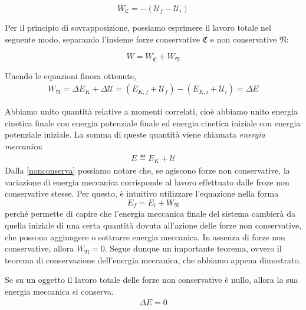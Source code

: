 \[ W_\mathfrak{C} = -(\mathcal{U}_f - \mathcal{U}_i) \]

\noindent Per il principio di sovrapposizione, possiamo esprimere il lavoro totale
nel seguente modo, separando l'insieme forze conservative $\mathfrak{C}$ e non conservative $\mathfrak{N}$:

\[ W = W_\mathfrak{C} + W_\mathfrak{N} \]

\noindent Unendo le equazioni finora ottenute,
\begin{align}
    W_\mathfrak{N} = \Delta E_K + \Delta\mathcal{U} = (E_{K,f} + \mathcal{U}_f) - (E_{K,i} + \mathcal{U}_i) = \Delta E\label{nonconserva}
\end{align}

\noindent Abbiamo unito quantità relative a momenti correlati,
cioè abbiamo unito energia cinetica finale con energia potenziale finale
ed energia cinetica iniziale con energia potenziale iniziale.
La somma di queste quantità viene chiamata \textit{energia meccanica}:
\begin{align}
    E \eqdef E_K + \mathcal{U}
\end{align}
Dalla \ref{nonconserva} possiamo notare che, se agiscono forze non conservative,
la variazione di energia meccanica corrisponde al lavoro effettuato dalle
froze non conservative stesse. Per questo, è intuitivo utilizzare l'equazione
nella forma
\[ E_f = E_i + W_\mathfrak{N} \]
perché permette di capire che l'energia meccanica finale del sistema cambierà
da quella iniziale di una certa quantità dovuta all'azione delle forze non
conservative, che possono aggiungere o sottrarre energia meccanica.
In assenza di forze non conservative, allora $W_\mathfrak{N} = 0$.
Segue dunque un importante teorema, ovvero il teorema di conservazione
dell'energia meccanica, che abbiamo appena dimostrato.

\vspace{8pt}
\begin{tcolorbox}[colback = red!30, colframe = red!30!black, title = {Teorema di conservazione dell'energia meccanica}]
    Se su un oggetto il lavoro totale delle forze non conservative è nullo,
    allora la sua energia meccanica si conserva.
    \begin{align}
        \Delta E = 0
    \end{align}
\end{tcolorbox}
\vspace{5pt}